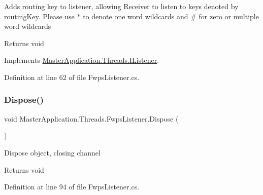 Adds routing key to listener, allowing Receiver to listen to keys denoted by \textquotesingle{}routing\+Key\textquotesingle{}. Please use \textquotesingle{}$\ast$\textquotesingle{} to denote one word wildcards and \textquotesingle{}\#\textquotesingle{} for zero or multiple word wildcards 

\begin{DoxyReturn}{Returns}
void
\end{DoxyReturn}


Implements \mbox{\hyperlink{interface_master_application_1_1_threads_1_1_i_listener_ae5d4878084f5003f98f99a5a3e4b5ec8}{Master\+Application.\+Threads.\+I\+Listener}}.



Definition at line 62 of file Fwps\+Listener.\+cs.

\mbox{\label{class_master_application_1_1_threads_1_1_fwps_listener_a7252861b396fe8ee18e4c183596e4696}} 
\subsubsection{\texorpdfstring{Dispose()}{Dispose()}}
{\footnotesize\ttfamily void Master\+Application.\+Threads.\+Fwps\+Listener.\+Dispose (\begin{DoxyParamCaption}{ }\end{DoxyParamCaption})}



Dispose object, closing channel 

\begin{DoxyReturn}{Returns}
void
\end{DoxyReturn}


Definition at line 94 of file Fwps\+Listener.\+cs.

\mbox{\label{class_master_application_1_1_threads_1_1_fwps_listener_af666026eb89f076643628aa181a05fc5}} 
